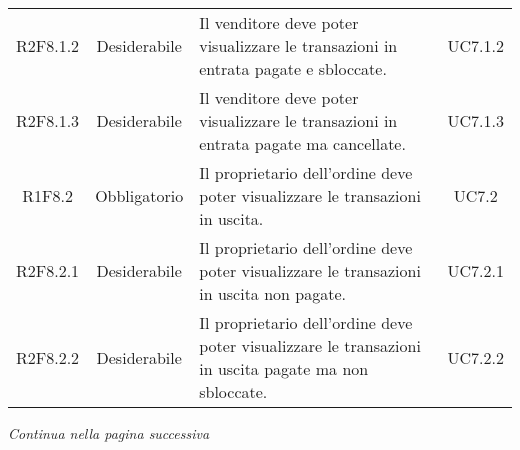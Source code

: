 \begin{table}[H]
\begin{tabular}{c | c | p{6cm} | c}
        R2F8.1.2                                                          & Desiderabile & Il venditore deve poter visualizzare le transazioni in entrata pagate e sbloccate.                                      & UC7.1.2                  \\
        R2F8.1.3                                                          & Desiderabile & Il venditore deve poter visualizzare le transazioni in entrata pagate ma cancellate.                                     & UC7.1.3                  \\
        R1F8.2                                                            & Obbligatorio & Il proprietario dell'ordine deve poter visualizzare le transazioni in uscita.                                         & UC7.2                    \\
        R2F8.2.1                                                          & Desiderabile & Il proprietario dell'ordine deve poter visualizzare le transazioni in uscita non pagate.                              & UC7.2.1                  \\
        R2F8.2.2                                                          & Desiderabile & Il proprietario dell'ordine deve poter visualizzare le transazioni in uscita pagate ma non sbloccate.                 & UC7.2.2                  \\
    \end{tabular}
\end{table}
\begin{center}
    \textit{\small Continua nella pagina successiva}
\end{center}
